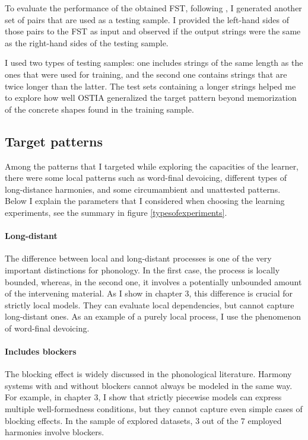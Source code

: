 To evaluate the performance of the obtained FST, following \cite{GildeaJurafsky1996}, I generated another set of pairs that are used as a testing sample.
I provided the left-hand sides of those pairs to the FST as input and observed if the output strings were the same as the right-hand sides of the testing sample.

I used two types of testing samples: one includes strings of the same length as the ones that were used for training, and the second one contains strings that are twice longer than the latter.
The test sets containing a longer strings helped me to explore how well OSTIA generalized the target pattern beyond memorization of the concrete shapes found in the training sample.


\subsection{Target patterns}

Among the patterns that I targeted while exploring the capacities of the learner, there were some local patterns such as word-final devoicing, different types of long-distance harmonies, and some circumambient and unattested patterns.
Below I explain the parameters that I considered when choosing the learning experiments, see the summary in figure \ref{typesofexperiments}.

\paragraph{Long-distant}
The difference between local and long-distant processes is one of the very important distinctions for phonology.
In the first case, the process is locally bounded, whereas, in the second one, it involves a potentially unbounded amount of the intervening material.
As I show in chapter 3, this difference is crucial for strictly local models.
They can evaluate local dependencies, but cannot capture long-distant ones.
As an example of a purely local process, I use the phenomenon of word-final devoicing.

\paragraph{Includes blockers}
The blocking effect is widely discussed in the phonological literature.
Harmony systems with and without blockers cannot always be modeled in the same way.
For example, in chapter 3, I show that strictly piecewise models can express multiple well-formedness conditions, but they cannot capture even simple cases of blocking effects.
In the sample of explored datasets, $3$ out of the $7$ employed harmonies involve blockers.

